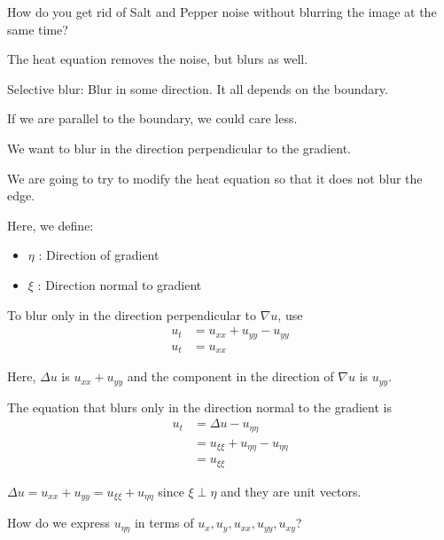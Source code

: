 
How do you get rid of Salt and Pepper noise without blurring the image at the same time?

The heat equation removes the noise, but blurs as well.


Selective blur: Blur in some direction. It all depends on the boundary.

If we are parallel to the boundary, we could care less.

We want to blur in the direction perpendicular to the gradient.



We are going to try to modify the heat equation so that it does not blur the edge.


Here, we define:

\begin{itemize}
  \item $\eta$ : Direction of gradient
  \item $\xi$ : Direction normal to gradient
\end{itemize}

To blur only in the direction perpendicular to $\nabla u$, use
%
\begin{align}
  u_t & = u_{xx} + u_{yy} - u_{yy}\\
  u_t & = u_{xx}
\end{align}

Here, $\Delta u$ is $u_{xx} + u_{yy}$ and the component in the direction of $\nabla u$ is $u_{yy}$.

The equation that blurs only in the direction normal to the gradient is
%
\begin{align}
  u_t & = \Delta u - u_{\eta \eta}\\
  & = u_{\xi \xi} + u_{\eta \eta} - u_{\eta \eta}\\
  & = u_{\xi \xi}
\end{align}

\note $\Delta u = u_{xx} + u_{yy} = u_{\xi \xi} + u_{\eta \eta}$ since $\xi \perp \eta$ and they are unit vectors.

How do we express $u_{\eta\eta}$ in terms of $u_x, u_y, u_{xx}, u_{yy}, u_{xy}$?

